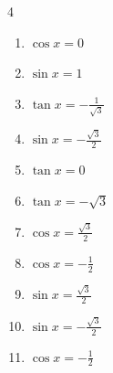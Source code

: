 \begin{multicols}{4}
\begin{enumerate}

  \item $\displaystyle \cos{x}  = 0$


\columnbreak %

  \item $\displaystyle \sin{x}  = 1$


  \item $\displaystyle \tan{x}  = -\frac{1}{\sqrt{3}}$


  \item $\displaystyle \sin{x}  = -\frac{\sqrt{3}}{2}$


  \item $\displaystyle \tan{x}  = 0$

        \phantom{$\displaystyle x = 0 , \pi$}

  \item $\displaystyle \tan{x}  = -\sqrt{3}$


  \item $\displaystyle \cos{x}  = \frac{\sqrt{3}}{2}$


  \item $\displaystyle \cos{x}  = -\frac{1}{2}$


  \item $\displaystyle \sin{x}  = \frac{\sqrt{3}}{2}$


  \item $\displaystyle \sin{x}  = -\frac{\sqrt{3}}{2}$


  \item $\displaystyle \cos{x}  = -\frac{1}{2}$


\end{enumerate}
\end{multicols}
